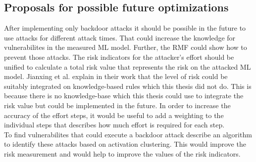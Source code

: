 \subsection{Proposals for possible future optimizations}

After implementing only backdoor attacks it should be possible in the future to use attacks for different attack times. That could increase the knowledge for vulnerabilites in the measured ML model. Further, the RMF could show how to prevent those attacks. The risk indicators for the attacker's effort should be unified to calculate a total risk value that represents the risk on the attacked ML model. Jianxing et al. \cite{DBLP:journals/access/JianxingHSH21} explain in their work that the level of risk could be suitably integrated on knowledge-based rules which this thesis did not do. This is because there is no knowledge-base which this thesis could use to integrate the risk value but could be implemented in the future. In order to increase the accuracy of the effort steps, it would be useful to add a weighting to the individual steps that describes how much effort is required for each step. \\
To find vulnerabilites that could execute a backdoor attack \cite{DBLP:journals/corr/abs-1811-03728} describe an algorithm to identify these attacks based on activation clustering. This would improve the risk measurement and would help to improve the values of the risk indicators.
